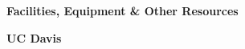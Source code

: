 
\setcounter{page}{1}
\renewcommand{\thepage}{Facilities, Equipment, and Other Resources - Page \arabic{page} of 2}

\begin{center}
\textbf{\large Facilities, Equipment \& Other Resources}
\end{center}


% 
% 









\textbf{UC Davis}

